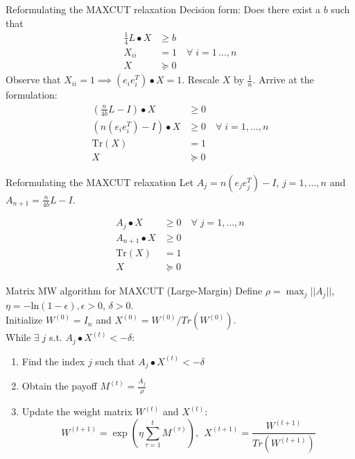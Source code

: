 \documentclass{beamer}
\begin{document}
\begin{frame}{Reformulating the MAXCUT relaxation}
Decision form: Does there exist a $b$ such that
\begin{align*}
\frac{1}{4} L \bullet X &\geq b \\
X_{ii} &= 1 \quad \forall \; i=1\,\ldots,n\\
X &\succcurlyeq 0
\end{align*}
Observe that $X_{ii} = 1 \implies (e_ie_i^T)\bullet X = 1$. Rescale $X$ by $\frac{1}{n}$. Arrive at the formulation:
\begin{align*}
\left(\frac{n}{4b} L - I\right) \bullet X &\geq 0 \\
\left(n(e_ie_i^T) - I\right) \bullet X &\geq 0 \quad \forall \; i = 1,\ldots,n \\
\text{Tr}(X) &= 1 \\
X &\succcurlyeq 0
\end{align*}
\end{frame}


\begin{frame}{Reformulating the MAXCUT relaxation}
Let $A_j = n(e_je_j^T) - I$, $j = 1, \dots, n$ and $A_{n+1} = \frac{n}{4b} L - I$. 

\begin{align*}
A_j \bullet X &\geq 0 \quad \forall \; j = 1,\ldots,n \\
A_{n+1} \bullet X &\geq 0 \\
\text{Tr}(X) &= 1 \\
X &\succcurlyeq 0
\end{align*}
\end{frame}


\begin{frame}{Matrix MW algorithm for MAXCUT (Large-Margin)}
Define $\rho = \max_j ||A_j||$, $\eta = -\text{ln}(1-\epsilon), \epsilon > 0$, $\delta > 0$. \\ \vspace{.5cm}
Initialize $W^{(0)} = I_n$ \quad and $X^{(0)} = W^{(0)}/Tr(W^{(0)})$. \\ \vspace{.5cm}
While $\exists \; j$ s.t. $A_j \bullet X^{(t)} < -\delta$:
\begin{enumerate}
\setlength\itemsep{1.2em}
\item Find the index $j$ such that $A_j \bullet X^{(t)} < -\delta$
\item Obtain the payoff $M^{(t)} = \frac{A_j}{\rho}$
\item Update the weight matrix $W^{(t)}$ and $X^{(t)}$:
$$ W^{(t+1)} = \exp \left(\eta \sum_{\tau =1}^t M^{(\tau)}\right) ,\ \ X^{(t+1)} = \frac{W^{(t+1)}}{Tr(W^{(t+1)})}$$

\end{enumerate}
\end{frame}
\end{document}
